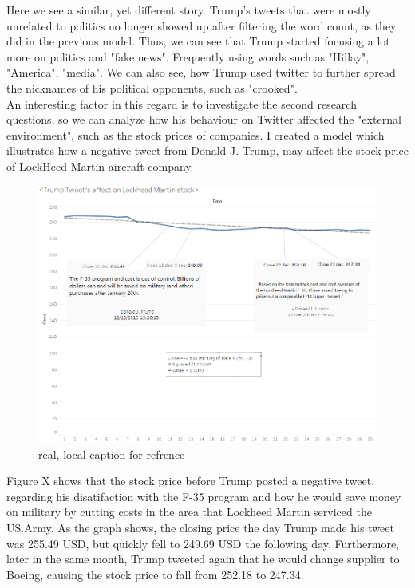 \documentclass{article}
\begin{document}
Here we see a similar, yet different story. Trump's tweets that were mostly unrelated to politics no longer showed up after filtering the word count, as they did in the previous model. Thus, we can see that Trump started focusing a lot more on politics and "fake news". Frequently using words such as "Hillay", "America", "media". We can also see, how Trump used twitter to further spread the nicknames of his political opponents, such as "crooked". \\

An interesting factor in this regard is to investigate the second research questions, so we can analyze how his behaviour on Twitter affected the "external environment", such as the stock prices of companies.  I created a model which illustrates how a negative tweet from Donald J. Trump, may affect the stock price of LockHeed Martin aircraft company.


\begin{figure}[H] %
	\centering %
\includegraphics [scale= .6]  {TrumpLockheedFinalDec.PNG}    %
	\caption[Optional caption] {real, local caption for refrence}
	\label{fig:wordcloudBliz}

\end{figure}

Figure X shows that the stock price before Trump posted a negative tweet, regarding his disatifaction with the F-35 program and how he would save money on military by cutting costs in the area that Lockheed Martin serviced the US.Army. As the graph shows, the closing price the day Trump made his tweet was 255.49 USD, but quickly fell to 249.69 USD the following day. Furthermore, later in the same month, Trump tweeted again that he would change supplier to Boeing, causing the stock price to fall from 252.18 to 247.34. \\
\end{document}
